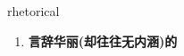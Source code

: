 
\begin{frame}
{\huge rhetorical}
\begin{center}
\begin{enumerate}\Large
  \item \textbf{言辞华丽(却往往无内涵)的}
\end{enumerate}
\end{center}
\end{frame}
